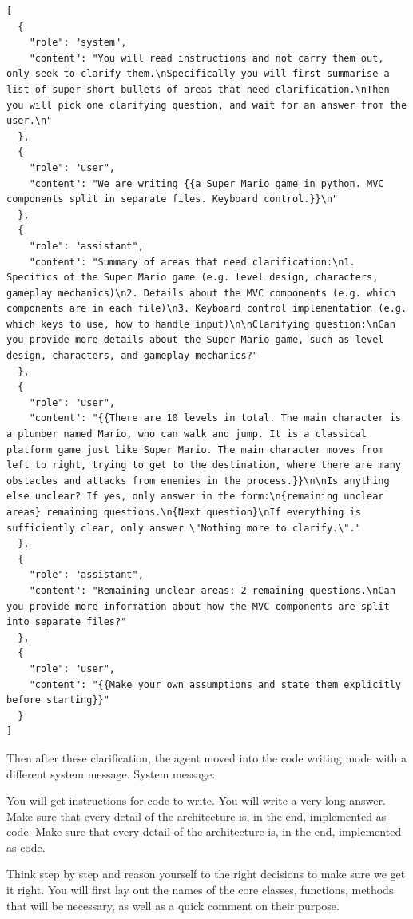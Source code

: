 \begin{verbatim}
[
  {
    "role": "system",
    "content": "You will read instructions and not carry them out, only seek to clarify them.\nSpecifically you will first summarise a list of super short bullets of areas that need clarification.\nThen you will pick one clarifying question, and wait for an answer from the user.\n"
  },
  {
    "role": "user",
    "content": "We are writing {{a Super Mario game in python. MVC components split in separate files. Keyboard control.}}\n"
  },
  {
    "role": "assistant",
    "content": "Summary of areas that need clarification:\n1. Specifics of the Super Mario game (e.g. level design, characters, gameplay mechanics)\n2. Details about the MVC components (e.g. which components are in each file)\n3. Keyboard control implementation (e.g. which keys to use, how to handle input)\n\nClarifying question:\nCan you provide more details about the Super Mario game, such as level design, characters, and gameplay mechanics?"
  },
  {
    "role": "user",
    "content": "{{There are 10 levels in total. The main character is a plumber named Mario, who can walk and jump. It is a classical platform game just like Super Mario. The main character moves from left to right, trying to get to the destination, where there are many obstacles and attacks from enemies in the process.}}\n\nIs anything else unclear? If yes, only answer in the form:\n{remaining unclear areas} remaining questions.\n{Next question}\nIf everything is sufficiently clear, only answer \"Nothing more to clarify.\"."
  },
  {
    "role": "assistant",
    "content": "Remaining unclear areas: 2 remaining questions.\nCan you provide more information about how the MVC components are split into separate files?"
  },
  {
    "role": "user",
    "content": "{{Make your own assumptions and state them explicitly before starting}}"
  }
]
\end{verbatim}

Then after these clarification, the agent moved into the code writing mode with a different system message. System message:

You will get instructions for code to write. You will write a very long answer. Make sure that every detail of the architecture is, in the end, implemented as code. Make sure that every detail of the architecture is, in the end, implemented as code.

Think step by step and reason yourself to the right decisions to make sure we get it right. You will first lay out the names of the core classes, functions, methods that will be necessary, as well as a quick comment on their purpose.

